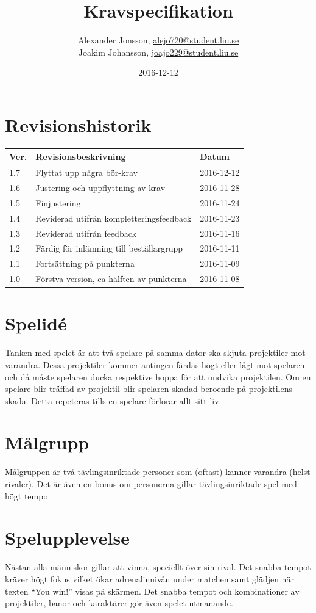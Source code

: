 \documentclass{TDP003mall}
\author{Alexander Jonsson, \url{alejo720@student.liu.se}\\
  Joakim Johansson, \url{joajo229@student.liu.se}}
\title{Kravspecifikation}
\date{2016-12-12}
\begin{document}
\projectpage
\section{Revisionshistorik}
\begin{table}[!h]
\begin{tabularx}{\linewidth}{|l|X|l|}
\hline
Ver. & Revisionsbeskrivning & Datum \\\hline
1.7 & Flyttat upp några bör-krav & 2016-12-12 \\\hline
1.6 & Justering och uppflyttning av krav & 2016-11-28 \\\hline
1.5 & Finjustering & 2016-11-24 \\\hline
1.4 & Reviderad utifrån kompletteringsfeedback & 2016-11-23 \\\hline
1.3 & Reviderad utifrån feedback & 2016-11-16 \\\hline
1.2 & Färdig för inlämning till beställargrupp & 2016-11-11 \\\hline
1.1 & Fortsättning på punkterna & 2016-11-09 \\\hline
1.0 & Förstva version, ca hälften av punkterna & 2016-11-08 \\\hline
\end{tabularx}
\end{table}

\newpage

\section{Spelidé}
Tanken med spelet är att två spelare på samma dator ska skjuta projektiler mot varandra. Dessa projektiler kommer antingen färdas högt eller lågt mot spelaren och då måste spelaren ducka respektive hoppa för att undvika projektilen. Om en spelare blir träffad av projektil blir spelaren skadad beroende på projektilens skada. Detta repeteras tills en spelare förlorar allt sitt liv.

\section{Målgrupp}
Målgruppen är två tävlingsinriktade personer som (oftast) känner varandra (helst rivaler). Det är även en bonus om personerna gillar tävlingsinriktade spel med högt tempo.

\section{Spelupplevelse}
Nästan alla människor gillar att vinna, speciellt över sin rival. Det snabba tempot kräver högt fokus vilket ökar adrenalinnivån under matchen samt glädjen när texten “You win!” visas på skärmen. Det snabba tempot och kombinationer av projektiler, banor och karaktärer gör även spelet utmanande.
\end{document}
